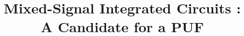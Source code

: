 \documentclass{llncs}
\begin{document}

\title{Mixed-Signal Integrated Circuits : A Candidate for a PUF}



\maketitle



%


%
%
\end{document}
